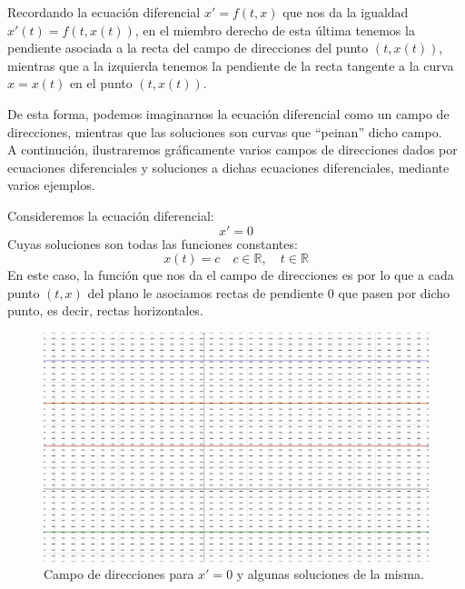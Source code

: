 Recordando la ecuación diferencial $x'=f(t,x)$ que nos da la igualdad ${x'(t) = f(t,x(t))}$, en el miembro derecho de esta última tenemos la pendiente asociada a la recta del campo de direcciones del punto $(t,x(t))$, mientras que a la izquierda tenemos la pendiente de la recta tangente a la curva $x=x(t)$ en el punto $(t,x(t))$.

De esta forma, podemos imaginarnos la ecuación diferencial como un campo de direcciones, mientras que las soluciones son curvas que ``peinan'' dicho campo.\\

A continución, ilustraremos gráficamente varios campos de direcciones dados por ecuaciones diferenciales y soluciones a dichas ecuaciones diferenciales, mediante varios ejemplos.

\begin{ejemplo}
    Consideremos la ecuación diferencial:
    \begin{equation*}
        x' = 0
    \end{equation*}
    Cuyas soluciones son todas las funciones constantes:
    \begin{equation*}
        x(t) = c \quad c\in \mathbb{R}, \quad t\in \mathbb{R}
    \end{equation*}
    En este caso, la función que nos da el campo de direcciones es
    por lo que a cada punto $(t,x)$ del plano le asociamos rectas de pendiente 0 que pasen por dicho punto, es decir, rectas horizontales.

\ifdefined\showimages
    \begin{figure}[H]
        \centering
        \includegraphics[width=0.6\linewidth]{Imagenes/campo_direcciones_1.png}
        \caption{Campo de direcciones para $x'=0$ y algunas soluciones de la misma.}
    \end{figure}
\fi
\end{ejemplo}

